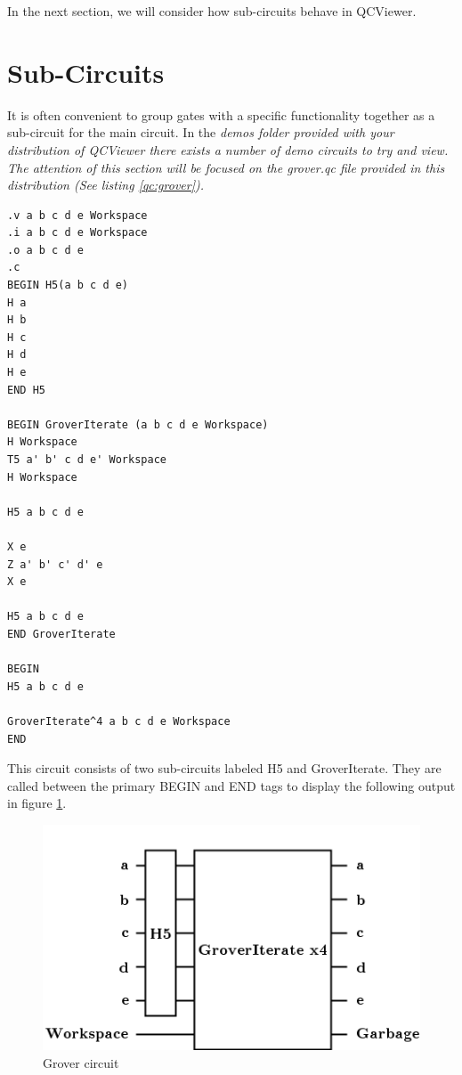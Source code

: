 \documentclass[10pt]{article}
\theoremstyle{definition}
\begin{document}
In the next section, we will consider how sub-circuits behave in QCViewer.

\section{Sub-Circuits}\label{sec:SubCircuits}

It is often convenient to group gates with a specific functionality together as a sub-circuit for the main circuit. In the \em demos \em folder provided with your distribution of QCViewer there exists a number of demo circuits to try and view. The attention of this section will be focused on the \em grover.qc \em file provided in this distribution (See listing \ref{qc:grover}).

\begin{program}
\caption{ .qc file for the grover circuit}
\label{qc:grover}
\begin{verbatim}
.v a b c d e Workspace
.i a b c d e Workspace
.o a b c d e
.c
BEGIN H5(a b c d e)
H a
H b
H c
H d
H e
END H5

BEGIN GroverIterate (a b c d e Workspace)
H Workspace
T5 a' b' c d e' Workspace
H Workspace

H5 a b c d e

X e
Z a' b' c' d' e
X e

H5 a b c d e
END GroverIterate

BEGIN
H5 a b c d e

GroverIterate^4 a b c d e Workspace 
END

\end{verbatim}
\end{program}

This circuit consists of two sub-circuits labeled H5 and GroverIterate. They are called between the primary BEGIN and END tags to display the following output in figure \ref{f:grover}.

\begin{figure}
\capstart
\centering
\includegraphics[scale=.5]{Figures/SubCircuits/GroverCircuit}
\caption{Grover circuit}
\label{f:grover}
\end{figure}
\end{document}
